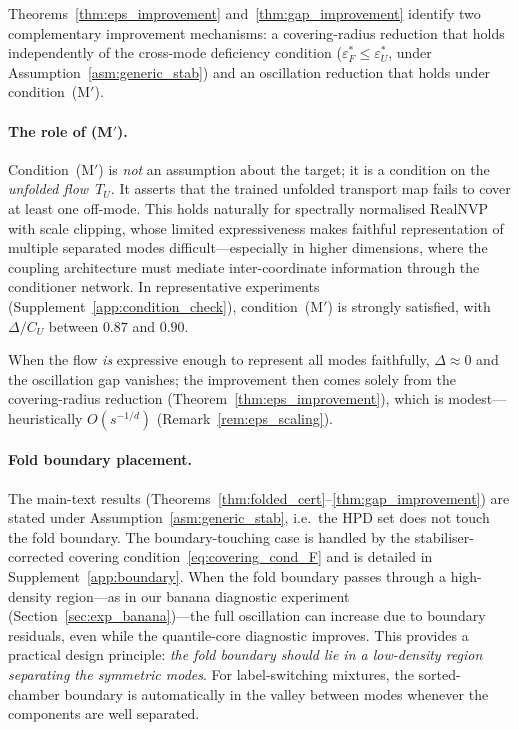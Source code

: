 Theorems~\ref{thm:eps_improvement} and~\ref{thm:gap_improvement}
identify two complementary improvement mechanisms: a covering-radius
reduction that holds independently of the cross-mode deficiency
condition ($\varepsilon_F^* \leq \varepsilon_U^*$, under
Assumption~\ref{asm:generic_stab}) and an oscillation
reduction that holds under condition~(M$'$).

\paragraph{The role of (M$'$).}
Condition~(M$'$) is \emph{not} an assumption about the target; it is
a condition on the \emph{unfolded flow}~$T_U$.  It asserts that the
trained unfolded transport map fails to cover at least one off-mode.  This holds
naturally for spectrally normalised RealNVP with scale clipping,
whose limited expressiveness makes faithful representation of
multiple separated modes difficult---especially in higher dimensions,
where the coupling architecture must mediate inter-coordinate
information through the conditioner network.  In representative
experiments (Supplement~\ref{app:condition_check}), condition~(M$'$)
is strongly satisfied, with $\Delta/C_U$ between $0.87$ and $0.90$.

When the flow \emph{is} expressive enough to represent all modes
faithfully, $\Delta \approx 0$ and the oscillation gap vanishes;
the improvement then comes solely from the covering-radius
reduction (Theorem~\ref{thm:eps_improvement}), which is
modest---heuristically $O(s^{-1/d})$
(Remark~\ref{rem:eps_scaling}).

\paragraph{Fold boundary placement.}
The main-text results
(Theorems~\ref{thm:folded_cert}--\ref{thm:gap_improvement})
are stated under Assumption~\ref{asm:generic_stab}, i.e.\ the HPD
set does not touch the fold boundary.  The boundary-touching case
is handled by the stabiliser-corrected covering
condition~\eqref{eq:covering_cond_F} and is detailed in
Supplement~\ref{app:boundary}.
When the fold boundary passes
through a high-density region---as in our banana diagnostic
experiment (Section~\ref{sec:exp_banana})---the full oscillation
can increase due to boundary residuals, even while the
quantile-core diagnostic improves.  This provides a practical
design principle: \emph{the fold boundary should lie in a
low-density region separating the symmetric modes}.
For label-switching mixtures, the sorted-chamber boundary
is automatically in the valley between modes whenever the
components are well separated.

